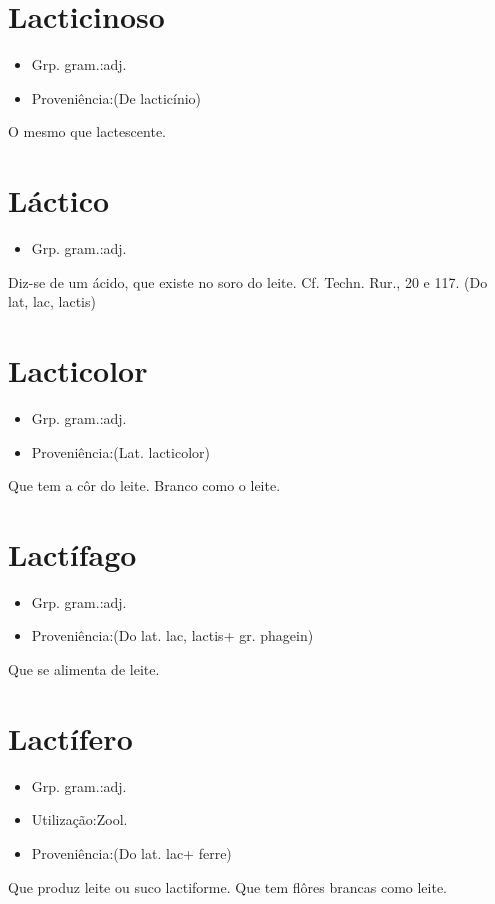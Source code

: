 \section{Lacticinoso}
\begin{itemize}
\item {Grp. gram.:adj.}
\end{itemize}
\begin{itemize}
\item {Proveniência:(De \textunderscore lacticínio\textunderscore )}
\end{itemize}
O mesmo que \textunderscore lactescente\textunderscore .
\section{Láctico}
\begin{itemize}
\item {Grp. gram.:adj.}
\end{itemize}
Diz-se de um ácido, que existe no soro do leite. Cf. \textunderscore Techn. Rur.\textunderscore , 20 e 117.
(Do lat, \textunderscore lac\textunderscore , \textunderscore lactis\textunderscore )
\section{Lacticolor}
\begin{itemize}
\item {Grp. gram.:adj.}
\end{itemize}
\begin{itemize}
\item {Proveniência:(Lat. \textunderscore lacticolor\textunderscore )}
\end{itemize}
Que tem a côr do leite.
Branco como o leite.
\section{Lactífago}
\begin{itemize}
\item {Grp. gram.:adj.}
\end{itemize}
\begin{itemize}
\item {Proveniência:(Do lat. \textunderscore lac\textunderscore , \textunderscore lactis\textunderscore  + gr. \textunderscore phagein\textunderscore )}
\end{itemize}
Que se alimenta de leite.
\section{Lactífero}
\begin{itemize}
\item {Grp. gram.:adj.}
\end{itemize}
\begin{itemize}
\item {Utilização:Zool.}
\end{itemize}
\begin{itemize}
\item {Proveniência:(Do lat. \textunderscore lac\textunderscore  + \textunderscore ferre\textunderscore )}
\end{itemize}
Que produz leite ou suco lactiforme.
Que tem flôres brancas como leite.
